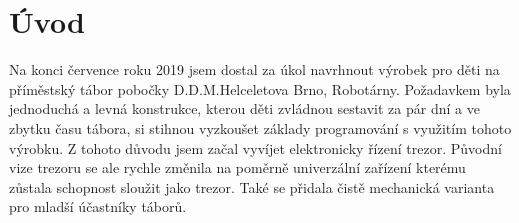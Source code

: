 \section*{Úvod}

Na konci července roku 2019 jsem dostal za úkol navrhnout výrobek pro děti na příměstský tábor pobočky D.D.M.Helceletova Brno, Robotárny. Požadavkem 
byla jednoduchá a levná konstrukce, kterou děti zvládnou sestavit za pár dní a ve zbytku času tábora, si stihnou vyzkoušet základy programování 
s využitím tohoto výrobku. Z tohoto důvodu jsem začal vyvíjet elektronicky řízení trezor. Původní vize trezoru se ale rychle změnila na poměrně 
univerzální zařízení kterému zůstala schopnost sloužit jako trezor. Také se přidala čistě mechanická varianta pro mladší účastníky táborů.




\newpage